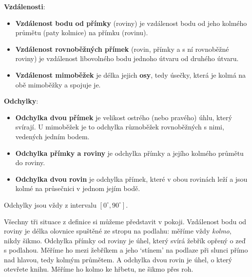 \begin{definitionbox}
  \textbf{Vzdálenosti}:
  \begin{itemize}
    \item \textbf{Vzdálenost bodu od přímky} (roviny) je vzdálenost bodu od jeho kolmého průmětu (paty kolmice) na přímku (rovinu).
    \item \textbf{Vzdálenost rovnoběžných přímek} (rovin, přímky a s ní rovnoběžné roviny) je vzdálenost libovolného bodu jednoho útvaru od druhého útvaru.
    \item \textbf{Vzdálenost mimoběžek} je délka jejich \textbf{osy}, tedy úsečky, která je kolmá na obě mimoběžky a spojuje je.
  \end{itemize}

  \textbf{Odchylky}:
  \begin{itemize}
    \item \textbf{Odchylka dvou přímek} je velikost ostrého (nebo pravého) úhlu, který svírají. U mimoběžek je to odchylka různoběžek rovnoběžných s nimi, vedených jedním bodem.
    \item \textbf{Odchylka přímky a roviny} je odchylka přímky a jejího kolmého průmětu do roviny.
    \item \textbf{Odchylka dvou rovin} je odchylka přímek, které v obou rovinách leží a jsou kolmé na průsečnici v jednom jejím bodě.
  \end{itemize}
  Odchylky jsou vždy z intervalu $[0^\circ, 90^\circ]$.
\end{definitionbox}

Všechny tři situace z definice si můžeme představit v pokoji. Vzdálenost bodu od roviny je délka olovnice spuštěné ze stropu na podlahu: měříme vždy \textit{kolmo}, nikdy šikmo. Odchylka přímky od roviny je úhel, který svírá žebřík opřený o zeď s podlahou. Měříme ho mezi žebříkem a jeho `stínem' na podlaze při slunci přímo nad hlavou, tedy kolmým průmětem. A odchylka dvou rovin je úhel, o který otevřete knihu. Měříme ho kolmo ke hřbetu, ne šikmo přes roh.

